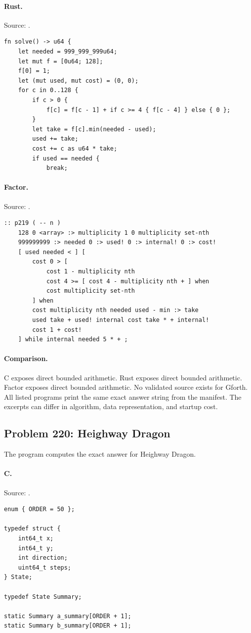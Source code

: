 \paragraph{Rust.} Source: .
\begin{lstlisting}
fn solve() -> u64 {
    let needed = 999_999_999u64;
    let mut f = [0u64; 128];
    f[0] = 1;
    let (mut used, mut cost) = (0, 0);
    for c in 0..128 {
        if c > 0 {
            f[c] = f[c - 1] + if c >= 4 { f[c - 4] } else { 0 };
        }
        let take = f[c].min(needed - used);
        used += take;
        cost += c as u64 * take;
        if used == needed {
            break;
\end{lstlisting}

\paragraph{Factor.} Source: .
\begin{lstlisting}
:: p219 ( -- n )
    128 0 <array> :> multiplicity 1 0 multiplicity set-nth
    999999999 :> needed 0 :> used! 0 :> internal! 0 :> cost!
    [ used needed < ] [
        cost 0 > [
            cost 1 - multiplicity nth
            cost 4 >= [ cost 4 - multiplicity nth + ] when
            cost multiplicity set-nth
        ] when
        cost multiplicity nth needed used - min :> take
        used take + used! internal cost take * + internal!
        cost 1 + cost!
    ] while internal needed 5 * + ;
\end{lstlisting}

\paragraph{Comparison.}
C exposes direct bounded arithmetic. Rust exposes direct bounded arithmetic. Factor exposes direct bounded arithmetic.
No validated source exists for Gforth.
All listed programs print the same exact answer string from the manifest. The excerpts can differ in algorithm, data representation, and startup cost.

\subsection{Problem 220: Heighway Dragon}
\label{walkthrough:p220}
The program computes the exact answer for Heighway Dragon.

\paragraph{C.} Source: .
\begin{lstlisting}
enum { ORDER = 50 };

typedef struct {
    int64_t x;
    int64_t y;
    int direction;
    uint64_t steps;
} State;

typedef State Summary;

static Summary a_summary[ORDER + 1];
static Summary b_summary[ORDER + 1];
\end{lstlisting}

